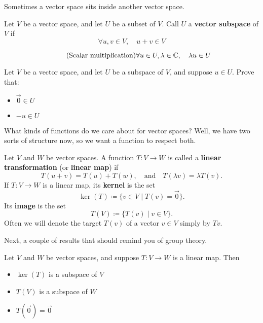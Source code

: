Sometimes a vector space sits inside another vector space.

\begin{definition}[Subspace]
    Let $V$ be a vector space, and let $U$ be a subset of $V$.
    Call $U$ a {\bf vector subspace} of $V$ if
    \begin{equation*}\tag{Addition}
        \forall u,v\in V, \quad u+v\in V
    \end{equation*}

    \begin{equation*}\tag{Scalar multiplication}
        \forall u\in U, \lambda\in\mathbb{C}, \quad \lambda u\in U
    \end{equation*}
\end{definition}

\begin{exercise}
    Let $V$ be a vector space, and let $U$ be a subspace of $V$, and suppose $u\in U$.
    Prove that:
    \begin{itemize}
        \item $\vec{0} \in U$
        \item $-u\in U$ 
    \end{itemize}
\end{exercise}

What kinds of functions do we care about for vector spaces?
Well, we have two sorts of structure now, so we want a function to respect both.

\begin{definition}
    Let $V$ and $W$ be vector spaces.
    A function $T:V\to W$ is called a {\bf linear transformation} (or {\bf linear map}) if
    \[
        T(u+v) = T(u) + T(w), \quad \text{and} \quad T(\lambda v) = \lambda T(v).
    \]
    If $T:V\to W$ is a linear map, its {\bf kernel} is the set
    \[
        \ker(T) \coloneq \{v\in V \mid T(v)=\vec{0}\}.
    \]
    Its {\bf image} is the set
    \[
        T(V) \coloneq \{ T(v) \mid v\in V\}.
    \]
    Often we will denote the target $T(v)$ of a vector $v\in V$ simply by $Tv$.
\end{definition}

Next, a couple of results that should remind you of group theory.

\begin{proposition}
    Let $V$ and $W$ be vector spaces, and suppose $T:V\to W$ is a linear map.
    Then
    \begin{itemize}
        \item $\ker(T)$ is a subspace of $V$
        \item $T(V)$ is a subspace of $W$
        \item $T(\vec{0}) = \vec{0}$
    \end{itemize}
\end{proposition}


